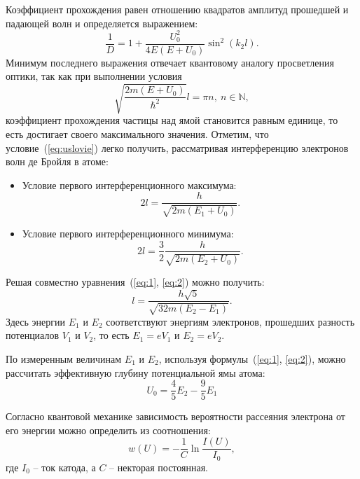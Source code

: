 \documentclass[a4paper,12pt]{report}
\begin{document}
	Коэффициент прохождения равен отношению квадратов амплитуд прошедшей и падающей волн и определяется выражением:
	\begin{equation*}
		\frac{1}{D} = 1 + \frac{U_0^2}{4E(E+U_0)}\sin^2(k_2l).
	\end{equation*}
	Минимум последнего выражения отвечает квантовому аналогу просветления оптики, так как при выполнении условия
	\begin{equation*}
		\tag{$\star$}
		\label{eq:uslovie}
		\sqrt{\frac{2m(E+U_0)}{\hbar^2}}l = \pi n, \ n\in\mathbb{N},
	\end{equation*}
	коэффициент прохождения частицы над ямой становится равным единице, то есть достигает своего максимального значения.
	Отметим, что условие~(\ref{eq:uslovie}) легко получить, рассматривая интерференцию электронов волн де Бройля в атоме:\\
	\begin{itemize}
		\item
			Условие первого интерференционного максимума:
			\begin{equation}
				\label{eq:1}
				2l = \frac{h}{\sqrt{2m(E_1+U_0)}}.
			\end{equation}
		\item
			Условие первого интерференционного минимума:
			\begin{equation}
				\label{eq:2}
				2l =\frac{3}{2} \frac{h}{\sqrt{2m(E_2+U_0)}}.
			\end{equation}			
	\end{itemize}

	Решая совместно уравнения~(\ref{eq:1}, \ref{eq:2}) можно получить:
	\begin{equation}
		\label{eq:l}
		l = \frac{h\sqrt{5}}{\sqrt{32m(E_2-E_1)}}.
	\end{equation}
	Здесь энергии $E_1$ и $E_2$ соответствуют энергиям электронов, прошедших разность потенциалов $V_1$ и $V_2$, то есть $E_1 = eV_1$ и $E_2 = eV_2$. 
	
	По измеренным величинам $E_1$ и $E_2$, используя формулы~(\ref{eq:1}, \ref{eq:2}), можно рассчитать эффективную глубину потенциальной ямы атома:
	\begin{equation}
		\label{eq:U_0}
		U_0 = \frac{4}{5}E_2 - \frac{9}{5}E_1
	\end{equation}

	Согласно квантовой механике зависимость вероятности рассеяния электрона от его энергии можно определить из соотношения:
	\begin{equation}
		\label{eq:w}
		w(U) = -\frac{1}{C}\ln \frac{I(U)}{I_0},
	\end{equation}
	где $I_0$ -- ток катода, а $C$ -- некторая постоянная.
\end{document}

